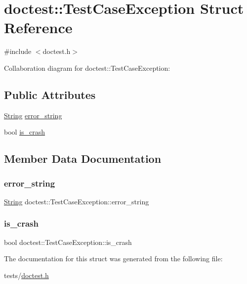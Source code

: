 \hypertarget{structdoctest_1_1TestCaseException}{}\section{doctest\+:\+:Test\+Case\+Exception Struct Reference}
\label{structdoctest_1_1TestCaseException}


{\ttfamily \#include $<$doctest.\+h$>$}



Collaboration diagram for doctest\+:\+:Test\+Case\+Exception\+:
\subsection*{Public Attributes}
\begin{DoxyCompactItemize}
\item 
\hyperlink{classdoctest_1_1String}{String} \hyperlink{structdoctest_1_1TestCaseException_a656c8971ccbedc7d3a0a38f7c6af927e}{error\+\_\+string}
\item 
bool \hyperlink{structdoctest_1_1TestCaseException_af30d801dae6dd2f4ea01690bbf5faeca}{is\+\_\+crash}
\end{DoxyCompactItemize}


\subsection{Member Data Documentation}
\mbox{\label{structdoctest_1_1TestCaseException_a656c8971ccbedc7d3a0a38f7c6af927e}} 
\subsubsection{\texorpdfstring{error\+\_\+string}{error\_string}}
{\footnotesize\ttfamily \hyperlink{classdoctest_1_1String}{String} doctest\+::\+Test\+Case\+Exception\+::error\+\_\+string}

\mbox{\label{structdoctest_1_1TestCaseException_af30d801dae6dd2f4ea01690bbf5faeca}} 
\subsubsection{\texorpdfstring{is\+\_\+crash}{is\_crash}}
{\footnotesize\ttfamily bool doctest\+::\+Test\+Case\+Exception\+::is\+\_\+crash}



The documentation for this struct was generated from the following file\+:\begin{DoxyCompactItemize}
\item 
tests/\hyperlink{doctest_8h}{doctest.\+h}\end{DoxyCompactItemize}
